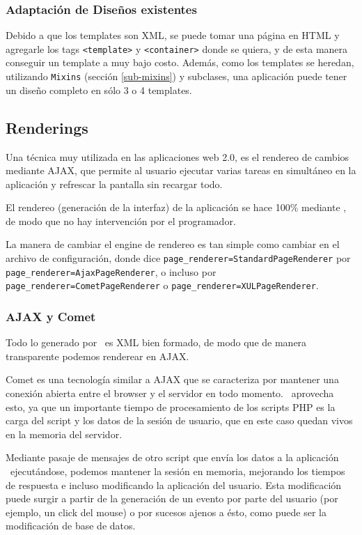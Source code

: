 \subsubsection{Adaptación de Diseños existentes}
\label{sub-templates-adapt}
Debido a que los templates son XML, se puede tomar una página en HTML y agregarle los tags \verb"<template>" y \verb"<container>" donde se quiera, y de esta manera conseguir un template a muy bajo costo. Además, como los templates se heredan, utilizando
\verb"Mixins" (sección \ref{sub-mixins}) y
subclases, una aplicación puede tener un diseño completo en sólo 3 o 4 templates.

\subsection{Renderings}
\label{sub-render}

Una técnica muy utilizada en las aplicaciones web 2.0, es el rendereo de cambios mediante AJAX, que permite al usuario ejecutar varias tareas en simultáneo en la aplicación y refrescar la pantalla sin recargar todo.

El rendereo (generación de la interfaz) de la aplicación se hace 100\% mediante \PWB, de modo que no hay intervención por el programador.

La manera de cambiar el engine de rendereo es tan simple como cambiar en el archivo de configuración, donde dice \verb"page_renderer=StandardPageRenderer" por \verb"page_renderer=AjaxPageRenderer", o incluso por \verb"page_renderer=CometPageRenderer" o \verb"page_renderer=XULPageRenderer".

\subsubsection{AJAX y Comet}

Todo lo generado por \PWB \ es XML bien formado, de modo que de manera transparente podemos renderear en AJAX.

Comet es una tecnología similar a AJAX que se caracteriza por mantener una conexión abierta entre el browser y el servidor en todo momento. \PWB \ aprovecha esto, ya que un importante tiempo de procesamiento de los scripts PHP es la carga del script y los datos de la sesión de usuario, que en este caso quedan vivos en la memoria del servidor.

Mediante pasaje de mensajes de otro script que envía los datos a la aplicación \PWB \ ejecutándose, podemos mantener la sesión en memoria, mejorando los tiempos de respuesta e incluso modificando la aplicación del usuario. Esta modificación puede surgir a partir de la generación de un evento por parte del usuario (por ejemplo, un click del mouse) o por sucesos ajenos a ésto, como puede ser la modificación de base de datos.

